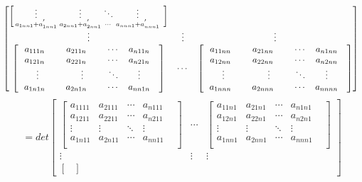 \documentclass{amsc}          %
\numberwithin{equation}{section} %
\begin{document}
\begin{list}{}
$$\begin{bmatrix}
\begin{bmatrix}
\begin{smallmatrix}
  \vdots&\vdots&\ddots &\vdots& \\
 a_{1nn1} + a_{1nn1}^{'}& a_{2nn1} + a_{2nn1}^{'}&\cdots&a_{nnn1} + a_{nnn1}^{'}\\
 \end{smallmatrix}\end{bmatrix}\\
\vdots & \vdots & \vdots\\
\begin{bmatrix}
  \ \ a_{111n}\ \ \ \ & a_{211n}\ \ \ \ &\cdots&a_{n11n}\\
  \ \ a_{121n}\ \ \ \ & a_{221n}\ \ \ \ &\cdots&a_{n21n}\\
  \vdots&\vdots&\ddots &\vdots& \\
  \ \ a_{1n1n}\ \ \ \ & a_{2n1n}\ \ \ \ &\cdots&a_{nn1n}\\
  \end{bmatrix}&
\cdots&
\begin{bmatrix}
  \ \ a_{11nn}\ \ \ \ & a_{21nn}\ \ \ \ &\cdots&a_{n1nn}\\
  \ \ a_{12nn}\ \ \ \ & a_{22nn}\ \ \ \ &\cdots&a_{n2nn}\\
 \vdots&\vdots&\ddots &\vdots& \\
   \ \ a_{1nnn}\ \ \ \ & a_{2nnn}\ \ \ \ &\cdots&a_{nnnn}\\
\end{bmatrix}
\end{bmatrix}\\
\\$$
$$=det\begin{bmatrix}
 \begin{bmatrix}
   a_{1111}& a_{2111}&\cdots&a_{n111}\\
   a_{1211}& a_{2211}&\cdots&a_{n211}\\
  \vdots&\vdots&\ddots &\vdots& \\
a_{1n11}& a_{2n11}&\cdots&a_{nn11}\\
\end{bmatrix}&
\cdots&
\begin{bmatrix}
  a_{11n1}& a_{21n1}&\cdots&a_{n1n1}\\
  a_{12n1}& a_{22n1}&\cdots&a_{n2n1}\\
  \vdots&\vdots&\ddots &\vdots& \\
 a_{1nn1}& a_{2nn1}&\cdots&a_{nnn1}\\
 \end{bmatrix}\\
\vdots&\vdots&\vdots\\
\begin{bmatrix}

\end{bmatrix}
\end{bmatrix}$$
\end{list}
\end{document}
